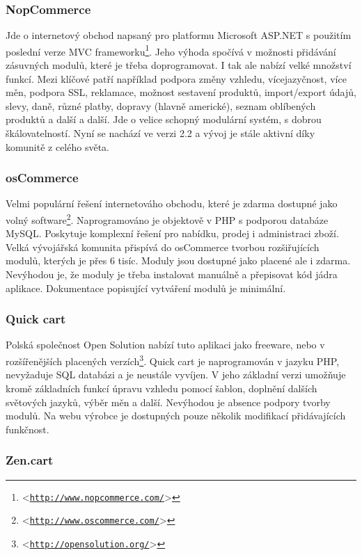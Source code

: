 \documentclass[11pt,twoside,a4paper]{book}
\let\oldUrl\url
\renewcommand\url[1]{<\texttt{\oldUrl{#1}}>}
\begin{document}
\subsubsection{NopCommerce}
\label{nop}
Jde o internetový obchod napsaný pro platformu Microsoft ASP.NET s použitím poslední verze MVC frameworku\footnote{\url{http://www.nopcommerce.com/}}. Jeho výhoda spočívá v možnosti přidávání zásuvných modulů, které je třeba doprogramovat. I tak ale nabízí velké množství funkcí. Mezi klíčové patří například podpora změny vzhledu, vícejazyčnost, více měn, podpora SSL, reklamace, možnost sestavení produktů, import/export údajů, slevy, daně, různé platby, dopravy (hlavně americké), seznam oblíbených produktů a další a další. Jde o velice schopný modulární systém, s dobrou škálovatelností. Nyní se nachází ve verzi 2.2 a vývoj je stále aktivní díky komunitě z celého světa.

\subsubsection{osCommerce}

Velmi populární řešení internetováho obchodu, které je zdarma dostupné jako volný software\footnote{\url{http://www.oscommerce.com/}}. Naprogramováno je objektově v PHP s podporou databáze MySQL. Poskytuje komplexní řešení pro nabídku, prodej i administraci zboží. Velká vývojářská komunita přispívá do osCommerce tvorbou rozšiřujících modulů, kterých je přes 6 tisíc. Moduly jsou dostupné jako placené ale i zdarma.  Nevýhodou je, že moduly je třeba instalovat manuálně a přepisovat kód jádra aplikace. Dokumentace popisující vytváření modulů je minimální.

\subsubsection{Quick cart}

Polská společnost Open Solution nabízí tuto aplikaci jako freeware, nebo v rozšířenějších placených verzích\footnote{\url{http://opensolution.org/}}. Quick cart je naprogramován v jazyku PHP, nevyžaduje SQL databázi a je neustále vyvíjen. V jeho základní verzi umožňuje kromě základních funkcí úpravu vzhledu pomocí šablon, doplnění dalších světových jazyků, výběr měn a další. Nevýhodou je absence podpory tvorby modulů. Na webu výrobce je dostupných pouze několik modifikací přidávajících funkčnost. 

\subsubsection{Zen.cart}
\end{document}

